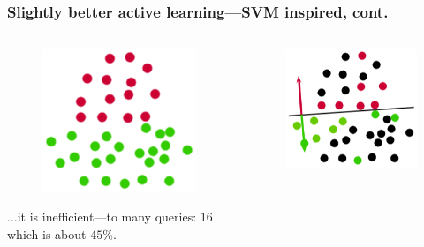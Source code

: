 \documentclass{beamer}
\begin{document}
  \begin{frame}
    \frametitle{Slightly better active learning---SVM inspired, cont.}
    \begin{columns}
      \begin{column}{5cm}
        \begin{figure}
          \includegraphics[scale=.25]{graphics/presentation/al1a} 
        \end{figure}
        ...it is inefficient---to many queries: $16$ which is about $45\%$.\\

      \end{column}
      \begin{column}{5cm}
        \begin{figure}
          \includegraphics[scale=.5]{graphics/presentation/al1d} 
        \end{figure}
      \end{column}
    \end{columns}
  \end{frame}
\end{document}
